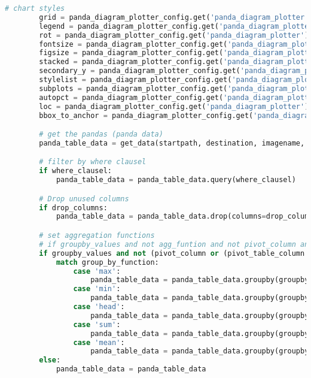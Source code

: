 \begin{lstlisting}[language=python, caption=Python LaTex - pandas\_data\_chart\_plotter.py CSV - Diagramm,captionpos=b,label={lst:pandas_data_chart_plotter},breaklines=true]
        # chart styles
        grid = panda_diagram_plotter_config.get('panda_diagram_plotter').get(table_item).get('chart-designs').get('grid')
        legend = panda_diagram_plotter_config.get('panda_diagram_plotter').get(table_item).get('chart-designs').get('legend')
        rot = panda_diagram_plotter_config.get('panda_diagram_plotter').get(table_item).get('chart-designs').get('rot')
        fontsize = panda_diagram_plotter_config.get('panda_diagram_plotter').get(table_item).get('chart-designs').get('fontsize')
        figsize = panda_diagram_plotter_config.get('panda_diagram_plotter').get(table_item).get('chart-designs').get('figsize')
        stacked = panda_diagram_plotter_config.get('panda_diagram_plotter').get(table_item).get('chart-designs').get('stacked')
        secondary_y = panda_diagram_plotter_config.get('panda_diagram_plotter').get(table_item).get('chart-designs').get('secondary_y')
        stylelist = panda_diagram_plotter_config.get('panda_diagram_plotter').get(table_item).get('chart-designs').get('stylelist')
        subplots = panda_diagram_plotter_config.get('panda_diagram_plotter').get(table_item).get('chart-designs').get('subplots')
        autopct = panda_diagram_plotter_config.get('panda_diagram_plotter').get(table_item).get('chart-designs').get('autopct')
        loc = panda_diagram_plotter_config.get('panda_diagram_plotter').get(table_item).get('chart-designs').get('loc')
        bbox_to_anchor = panda_diagram_plotter_config.get('panda_diagram_plotter').get(table_item).get('chart-designs').get('bbox_to_anchor')

        # get the pandas (panda data)
        panda_table_data = get_data(startpath, destination, imagename, datafile_path, datafile, separator, decimal)

        # filter by where clausel
        if where_clausel:
            panda_table_data = panda_table_data.query(where_clausel)

        # Drop unused columns
        if drop_columns:
            panda_table_data = panda_table_data.drop(columns=drop_columns)

        # set aggregation functions
        # if groupby_values and not agg_funtion and not pivot_column and not pivot_table_column:
        if groupby_values and not (pivot_column or (pivot_table_column or pivot_table_value or pivot_table_indizes)):
            match group_by_function:
                case 'max':
                    panda_table_data = panda_table_data.groupby(groupby_values, as_index=False).max()
                case 'min':
                    panda_table_data = panda_table_data.groupby(groupby_values, as_index=False).min()
                case 'head':
                    panda_table_data = panda_table_data.groupby(groupby_values, as_index=False).head()
                case 'sum':
                    panda_table_data = panda_table_data.groupby(groupby_values, as_index=False).sum()
                case 'mean':
                    panda_table_data = panda_table_data.groupby(groupby_values, as_index=False).mean()
        else:
            panda_table_data = panda_table_data


\end{lstlisting}
